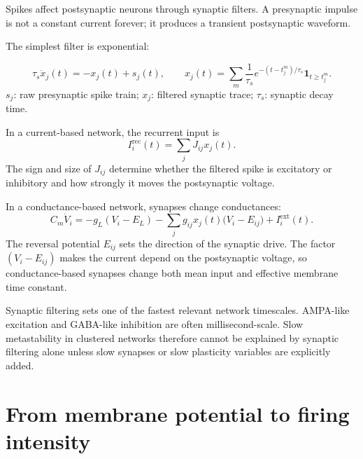 Spikes affect postsynaptic neurons through synaptic filters. A presynaptic impulse is not a constant current forever; it produces a transient postsynaptic waveform.

The simplest filter is exponential:
%
\begin{keyequation}
\begin{equation}
  \tau_s\dot x_j(t)
  =
  -x_j(t)+s_j(t),
  \qquad
  x_j(t)
  =
  \sum_m
  \frac{1}{\tau_s}e^{-(t-t_j^m)/\tau_s}\mathbf{1}_{t\geq t_j^m}.
  \label{eq:exponential-synaptic-filter-project}
\end{equation}
\tcblower
$s_j$: raw presynaptic spike train; $x_j$: filtered synaptic trace; $\tau_s$: synaptic decay time.
\end{keyequation}

\noindent In a current-based network, the recurrent input is
%
\begin{equation}
  I_i^{\mathrm{rec}}(t)
  =
  \sum_j J_{ij}x_j(t).
  \label{eq:current-based-recurrent-input-ch03}
\end{equation}
%
The sign and size of $J_{ij}$ determine whether the filtered spike is excitatory or inhibitory and how strongly it moves the postsynaptic voltage.

In a conductance-based network, synapses change conductances:
%
\begin{equation}
  C_m\dot V_i
  =
  -g_L(V_i-E_L)
  -
  \sum_j g_{ij}x_j(t)\bigl(V_i-E_{ij}\bigr)
  +
  I_i^{\mathrm{ext}}(t).
  \label{eq:conductance-synaptic-input-ch03}
\end{equation}
%
The reversal potential $E_{ij}$ sets the direction of the synaptic drive. The factor $(V_i-E_{ij})$ makes the current depend on the postsynaptic voltage, so conductance-based synapses change both mean input and effective membrane time constant.

Synaptic filtering sets one of the fastest relevant network timescales. AMPA-like excitation and GABA-like inhibition are often millisecond-scale. Slow metastability in clustered networks therefore cannot be explained by synaptic filtering alone unless slow synapses or slow plasticity variables are explicitly added.

\section{From membrane potential to firing intensity}
\label{sec:membrane-to-intensity}

